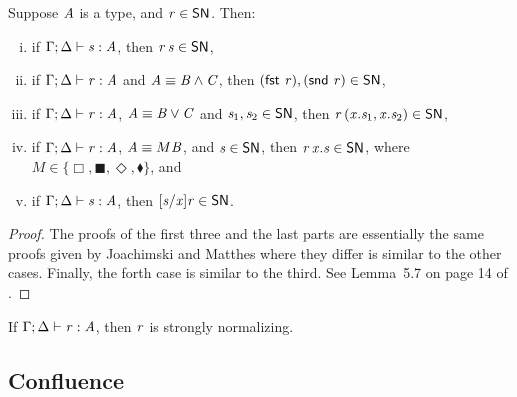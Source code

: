 \begin{lemma}
  \label{lemma:typable_eliminations_are_in_SN}
  Suppose $\mathit{A}$ is a type, and $\mathit{r} \in \mathsf{SN}$.  Then:
  \begin{enumerate}[i.]
  \item if $\Gamma  ;  \Delta  \vdash  \mathit{s}  :  \mathit{A}$, then $\mathit{r} \, \mathit{s} \in \mathsf{SN}$,
  \item if $\Gamma  ;  \Delta  \vdash  \mathit{r}  :  \mathit{A}$ and $\mathit{A} \equiv  \mathit{B}  \land  \mathit{C} $, then $(  \mathsf{fst}\, \, \mathit{r}  ),(  \mathsf{snd}\, \, \mathit{r}  ) \in \mathsf{SN}$,
  \item if $\Gamma  ;  \Delta  \vdash  \mathit{r}  :  \mathit{A}$, $\mathit{A} \equiv  \mathit{B}  \lor  \mathit{C} $ and $\mathit{s_{{\mathrm{1}}}},\mathit{s_{{\mathrm{2}}}} \in \mathsf{SN}$,
    then $\mathit{r} \,  ( \mathit{x} . \mathit{s_{{\mathrm{1}}}} , \mathit{x} . \mathit{s_{{\mathrm{2}}}} )  \in \mathsf{SN}$,
  \item if $\Gamma  ;  \Delta  \vdash  \mathit{r}  :  \mathit{A}$, $\mathit{A} \equiv  \mathbin{M}  \mathit{B} $, and $\mathit{s} \in \mathsf{SN}$, then $\mathit{r} \,  \mathit{x} . \mathit{s}  \in \mathsf{SN}$,
    where $M \in \{ \Box ,  \blacksquare ,  \Diamond ,  \mathbin{\blacklozenge}  \}$, and
  \item if $\Gamma  ;  \Delta  \vdash  \mathit{s}  :  \mathit{A}$, then $[  \mathit{s}  /  \mathit{x}  ]  \mathit{r} \in \mathsf{SN}$.
  \end{enumerate}
\end{lemma}
\begin{proof}
  The proofs of the first three and the last parts are essentially the
  same proofs given by Joachimski and Matthes where they differ is
  similar to the other cases.  Finally, the forth case is similar to
  the third. See Lemma~5.7 on page 14 of \cite{Joachimski:2003}.
\end{proof}

\begin{corollary}
  \label{corollary:strong_normalization}
  If $\Gamma  ;  \Delta  \vdash  \mathit{r}  :  \mathit{A}$, then $\mathit{r}$ is strongly normalizing.
\end{corollary}

\subsection{Confluence}
\label{subsec:confluence}

